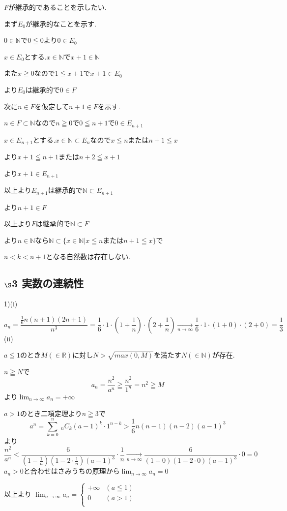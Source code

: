 \documentclass{jsarticle}
\begin{document}
$F$が継承的であることを示したい.

まず$E_0$が継承的なことを示す.

$0\in \mathbb{N}$で$0\leqq 0$より$0\in E_0$

$x\in E_0$とする.$x\in \mathbb{N}$で$x+1\in\mathbb{N}$

また$x\geqq 0$なので$1\leqq x+1$で$x+1\in E_0$

より$E_0$は継承的で$0\in F$

次に$n\in F$を仮定して$n+1\in F$を示す.

$n\in F \subset \mathbb{N}$なので$n\geqq 0$で$0\leqq n+1$で$0\in E_{n+1}$

$x\in E_{n+1}$とする.$x \in \mathbb{N} \subset E_n$なので$x\leqq n $または$n+1\leqq x$

より$x+1\leqq n+1$または$n+2\leqq x+1$

より$x+1\in E_{n+1}$

以上より$E_{n+1}$は継承的で$\mathbb{N}\subset E_{n+1}$

より$n+1\in F$

以上より$F$は継承的で$\mathbb{N}\subset F$

より$n\in \mathbb{N}$なら$\mathbb{N}\subset \{x\in \mathbb{N}|x\leqq nまたは n+1\leqq x\}$で

$n<k<n+1$となる自然数は存在しない.
\subsection*{$\S$3 実数の連続性}
1)(i)

\[a_n=\frac{\frac{1}{6}n(n+1)(2n+1)}{n^3}=\frac{1}{6}\cdot 1\cdot (1+\frac{1}{n})\cdot (2+\frac{1}{n})\xrightarrow[n\to \infty]{} \frac{1}{6}\cdot 1\cdot (1+0)\cdot (2+0)=\frac{1}{3}\]
(ii)

$a\leqq 1$のとき$M(\in\mathbb{R})$に対し$N>\sqrt{max(0,M)}$を満たす$N(\in \mathbb{N})$が存在.

$n\geqq N$で
\[a_n = \frac{n^2}{a^n}\geqq \frac{n^2}{1^n}=n^2  \geqq M\]
より$\displaystyle\lim_{n\to\infty}a_n=+\infty$

$a>1$のとき二項定理より$n\geqq3$で
\[a^n =\sum_{k=0}^n \ _nC_k(a-1)^k\cdot 1^{n-k}>\frac{1}{6}n(n-1)(n-2)(a-1)^3\]
より
\[\frac{n^2}{a^n}<\frac{6}{(1-\frac{1}{n})(1-2\cdot\frac{1}{n})(a-1)^3}\cdot\frac{1}{n}\xrightarrow[n\to \infty]{}\frac{6}{(1-0)(1-2\cdot 0)(a-1)^3}\cdot0=0\]
$a_n>0$と合わせはさみうちの原理から$\displaystyle\lim_{n\to\infty}a_n=0$

以上より
$\displaystyle\lim_{n\to\infty}a_n=\begin{cases}
+\infty & (a\leqq 1)\\
0 & (a> 1)\\
\end{cases}$
\end{document}
